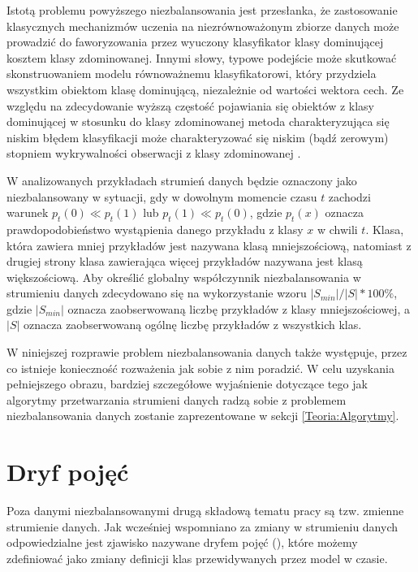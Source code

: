 Istotą problemu powyższego niezbalansowania jest przesłanka, że zastosowanie klasycznych mechanizmów uczenia na niezrównoważonym zbiorze danych może prowadzić do faworyzowania przez wyuczony klasyfikator klasy dominującej kosztem klasy zdominowanej. Innymi słowy, typowe podejście może skutkować skonstruowaniem modelu równoważnemu klasyfikatorowi, który przydziela wszystkim obiektom klasę dominującą, niezależnie od wartości wektora cech. Ze względu na zdecydowanie wyższą częstość pojawiania się obiektów z klasy dominującej w stosunku do klasy zdominowanej metoda charakteryzująca się niskim błędem klasyfikacji może charakteryzować się niskim (bądź zerowym) stopniem wykrywalności obserwacji z klasy zdominowanej \cite{MZieba}.

\label{Label:ImbalanceData}
W analizowanych przykładach strumień danych będzie oznaczony jako niezbalansowany w sytuacji, gdy w dowolnym momencie czasu $t$ zachodzi warunek $p_t(0) \ll p_t(1)$ lub $p_t(1) \ll p_t(0)$, gdzie $p_t(x)$ oznacza prawdopodobieństwo wystąpienia danego przykładu z klasy $x$ w chwili $t$. Klasa, która zawiera mniej przykładów jest nazywana klasą mniejszościową, natomiast z drugiej strony klasa zawierająca więcej przykładów nazywana jest klasą większościową. Aby określić globalny współczynnik niezbalansowania w strumieniu danych zdecydowano się na wykorzystanie wzoru $|S_{min}|/|S| * 100\%$, gdzie $|S_{min}|$ oznacza zaobserwowaną liczbę przykładów z klasy mniejszościowej, a $|S|$ oznacza zaobserwowaną ogólnę liczbę przykładów z wszystkich klas.

W niniejszej rozprawie problem niezbalansowania danych także występuje, przez co istnieje konieczność rozważenia jak sobie z nim poradzić. W celu uzyskania pełniejszego obrazu, bardziej szczegółowe wyjaśnienie dotyczące tego jak algorytmy przetwarzania strumieni danych radzą sobie z problemem niezbalansowania danych zostanie zaprezentowane w sekcji \ref{Teoria:Algorytmy}.


\section{Dryf pojęć}

\noindent Poza danymi niezbalansowanymi drugą składową tematu pracy są tzw. zmienne strumienie danych. Jak wcześniej wspomniano za zmiany w strumieniu danych odpowiedzialne jest zjawisko nazywane dryfem pojęć (), które możemy zdefiniować jako zmiany definicji klas przewidywanych przez model w czasie.


